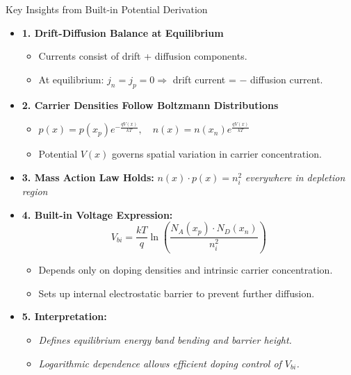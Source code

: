 \begin{frame}{Key Insights from Built-in Potential Derivation}
    \begin{itemize}
		\item \textbf{1. Drift-Diffusion Balance at Equilibrium}
		\begin{itemize}
			\item Currents consist of drift + diffusion components.
			\item At equilibrium: $j_n = j_p = 0 \Rightarrow$ drift current = $-$ diffusion current.
		\end{itemize}

        \item \textbf{2. Carrier Densities Follow Boltzmann Distributions}
        \begin{itemize}
            \item $p(x) = p(x_p) e^{-\frac{qV(x)}{kT}},\quad n(x) = n(x_n) e^{\frac{qV(x)}{kT}}$
            \item Potential $V(x)$ governs spatial variation in carrier concentration.
        \end{itemize}

        \item \textbf{3. Mass Action Law Holds:} $n(x) \cdot p(x) = n_i^2$ \textit{everywhere in depletion region}

        \item \textbf{4. Built-in Voltage Expression:}
        \begin{equation}
            V_{bi} = \frac{kT}{q} \ln\left(\frac{N_A(x_p) \cdot N_D(x_n)}{n_i^2}\right)
		\end{equation}
        \begin{itemize}
            \item Depends only on doping densities and intrinsic carrier concentration.
            \item Sets up internal electrostatic barrier to prevent further diffusion.
        \end{itemize}

        \item \textbf{5. Interpretation:}
        \begin{itemize}
            \item \textit{Defines equilibrium energy band bending and barrier height.}
            \item \textit{Logarithmic dependence allows efficient doping control of $V_{bi}$.}
        \end{itemize}
    \end{itemize}
\end{frame}


